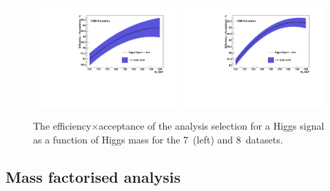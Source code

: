 \begin{figure}
  \includegraphics[width=0.49\textwidth]{analysis/plots/effAcc7TeV.pdf}
  \includegraphics[width=0.49\textwidth]{analysis/plots/effAcc8TeV.pdf}
  \caption{The efficiency$\times$acceptance of the analysis selection for a \SM Higgs signal as a function of Higgs mass for the 7~\TeV (left) and 8~\TeV datasets.}
  \label{fig:effacc}
\end{figure}

\subsection{Mass factorised analysis}
\label{sec:signal_mfm}

